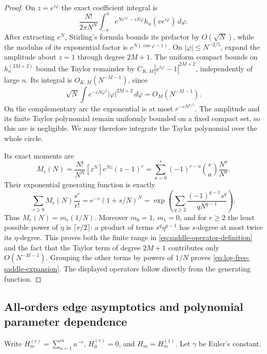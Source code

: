 \begin{proof}
On $z=e^{i\varphi}$ the exact coefficient integral is
\[
 \frac{N!}{2\pi N^N}\int_{-\pi}^{\pi}
       e^{N e^{i\varphi}-iN\varphi}h_n(ve^{i\varphi})\,d\varphi.
\]
After extracting $e^N$, Stirling's formula bounds its prefactor by
$O(\sqrt N)$, while the modulus of its exponential factor is
$e^{N(\cos\varphi-1)}$.  On $|\varphi|\leq N^{-2/5}$, expand the
amplitude about $z=1$ through degree $2M+1$.  The uniform compact
bounds on $h_n^{(2M+2)}$ bound the Taylor remainder by
$C_{K,M}|e^{i\varphi}-1|^{2M+2}$, independently of large $n$.
Its integral is $O_{K,M}(N^{-M-1})$, since
\[
 \sqrt N\int e^{-cN\varphi^2}|\varphi|^{2M+2}\,d\varphi
            =O_M(N^{-M-1}).
\]
On the complementary arc the exponential is at most
$e^{-cN^{1/5}}$.  The amplitude and its finite Taylor polynomial
remain uniformly bounded on a fixed compact set, so this arc is
negligible.  We may therefore integrate the Taylor polynomial over
the whole circle.

Its exact moments are
\[
 M_r(N)=\frac{N!}{N^N}[z^N]e^{Nz}(z-1)^r
       =\sum_{a=0}^r(-1)^{r-a}\binom ra
            \frac{N^{\underline a}}{N^a}.
\]
Their exponential generating function is exactly
\[
 \sum_{r\geq0}M_r(N)\frac{s^r}{r!}
       =e^{-s}(1+s/N)^N
       =\exp\left(\sum_{q\geq2}
               \frac{(-1)^{q-1}s^q}{qN^{q-1}}\right).
\]
Thus $M_r(N)=m_r(1/N)$.  Moreover $m_0=1$, $m_1=0$, and for
$r\geq2$ the least possible power of $\eta$ is $\lceil r/2\rceil$:
a product of terms $s^q\eta^{q-1}$ has $s$-degree at most twice
its $\eta$-degree.  This proves both the finite range in
\eqref{eq:saddle-operator-definition} and the fact that the
Taylor term of degree $2M+1$ contributes only $O(N^{-M-1})$.
Grouping the other terms by powers of $1/N$ proves
\eqref{eq:log-free-saddle-expansion}.  The displayed operators
follow directly from the generating function.
\end{proof}

\subsection{All-orders edge asymptotics and polynomial parameter dependence}

Write $H_m^{(r)}=\sum_{a=1}^m a^{-r}$, $H_0^{(r)}=0$, and
$H_m=H_m^{(1)}$.  Let $\gamma$ be Euler's constant.

